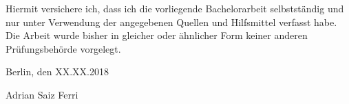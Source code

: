 
Hiermit versichere ich, dass ich die vorliegende Bachelorarbeit selbstständig und nur unter Verwendung der angegebenen Quellen und Hilfsmittel verfasst habe. Die Arbeit wurde bisher in gleicher oder ähnlicher Form keiner anderen Prüfungsbehörde vorgelegt.

\vskip 1cm

Berlin, den XX.XX.2018

\vskip 1.5cm

Adrian Saiz Ferri
